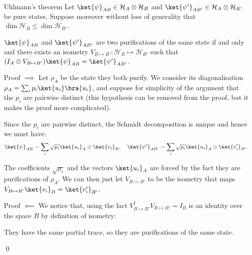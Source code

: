 \documentclass[a4paper]{article}
\begin{document}
\begin{parag}{Uhlmann's theorem}
    Let $\ket{\psi}_{AB} \in \mathcal{H}_A \otimes \mathcal{H}_B$ and $\ket{\psi'}_{AB'} \in \mathcal{H}_A \otimes \mathcal{H}_{B'}$ be pure states. Suppose moreover without loss of generality that $\dim \mathcal{H}_B \leq \dim \mathcal{H}_{B'}$.

    $\ket{\psi}_{AB}$ and $\ket{\psi'}_{AB'}$ are two purifications of the same state if and only and there exists an isometry $V_{B \mapsto B'}: \mathcal{H}_B \mapsto \mathcal{H}_{B'}$ such that $\left(I_A \otimes V_{B \mapsto B'}\right) \ket{\psi}_{AB} = \ket{\psi'}_{AB'}$.

    \begin{subparag}{Proof $\implies$}
        Let $\rho_A$ be the state they both purify. We consider its diagonalisation $\rho_A = \sum_{i} p_i \ket{u_i}\bra{u_i}$, and suppose for simplicity of the argument that the $p_i$ are pairwise distinct (this hypothesis can be removed from the proof, but it makes the proof more complicated).

        Since the $p_i$ are pairwise distinct, the Schmidt decomposition is unique and hence we must have: 
        \[\ket{\psi}_{AB} = \sum_{i} \sqrt{p_i} \ket{u_i}_A \otimes \ket{v_i}_{B}, \mathspace \ket{\psi'}_{AB'} = \sum_{i} \sqrt{p_i} \ket{u_i}_A \otimes \ket{v_i'}_{B'}.\]

        The coefficients $\sqrt{p_i}$ and the vectors $\ket{u_i}_A$ are forced by the fact they are purifications of $\rho_A$. We can then just let $V_{B \mapsto B'}$ to be the isometry that maps $V_{B \mapsto B'} \ket{v_i}_B = \ket{v_i'}_{B'}$.
    \end{subparag}

    \begin{subparag}{Proof $\impliedby$}
        We notice that, using the fact $V_{B \mapsto B'}^{\dagger} V_{B \mapsto B'} = I_{B}$ is an identity over the space $B$ by definition of isometry: 

        They have the same partial trace, so they are purifications of the same state.

        \qed
    \end{subparag}
\end{parag}
\end{document}
